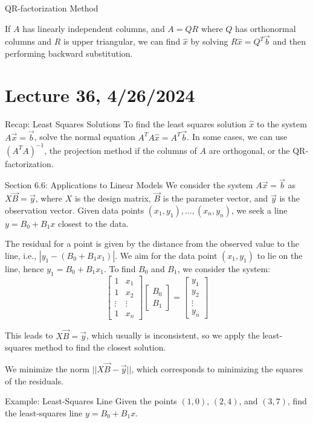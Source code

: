 \documentclass{article}
\begin{document}
QR-factorization Method

If $A$ has linearly independent columns, and $A = QR$ where $Q$ has orthonormal columns and $R$ is upper triangular, we can find $\hat{x}$ by solving $R\hat{x} = Q^T\vec{b}$ and then performing backward substitution.

\section{Lecture 36, 4/26/2024}

Recap: Least Squares Solutions
To find the least squares solution $\hat{x}$ to the system $A\vec{x} = \vec{b}$, solve the normal equation $A^TA\hat{x} = A^T\vec{b}$. In some cases, we can use $(A^TA)^{-1}$, the projection method if the columns of $A$ are orthogonal, or the QR-factorization.

Section 6.6: Applications to Linear Models
We consider the system $A\vec{x} = \vec{b}$ as $X\vec{B} = \vec{y}$, where $X$ is the design matrix, $\vec{B}$ is the parameter vector, and $\vec{y}$ is the observation vector. Given data points $(x_1, y_1), \ldots, (x_n, y_n)$, we seek a line $y = B_0 + B_1x$ closest to the data.

The residual for a point is given by the distance from the observed value to the line, i.e., $|y_1 - (B_0 + B_1x_1)|$. We aim for the data point $(x_1, y_1)$ to lie on the line, hence $y_1 = B_0 + B_1x_1$. To find $B_0$ and $B_1$, we consider the system:
\[
\begin{bmatrix}
1 & x_1 \\
1 & x_2 \\
\vdots & \vdots \\
1 & x_n
\end{bmatrix}
\begin{bmatrix}
B_0 \\
B_1
\end{bmatrix}
=
\begin{bmatrix}
y_1 \\
y_2 \\
\vdots \\
y_n
\end{bmatrix}
\]

This leads to $X\vec{B} = \vec{y}$, which usually is inconsistent, so we apply the least-squares method to find the closest solution.

We minimize the norm $||X\vec{B} - \vec{y}||$, which corresponds to minimizing the squares of the residuals.

Example: Least-Squares Line
Given the points $(1, 0)$, $(2, 4)$, and $(3, 7)$, find the least-squares line $y = B_0 + B_1x$.
\end{document}
